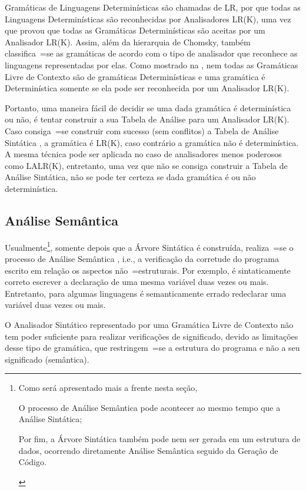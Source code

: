 Gramáticas de Linguagens Determinísticas são chamadas de LR,
por que todas as Linguagens Determinísticas são reconhecidas por Analisadores LR(K),
uma vez que  provou que todas as Gramáticas Determinísticas são aceitas por um Analisador LR(K).
Assim,
além da hierarquia de Chomsky,
também classifica~=se as gramáticas de acordo com o tipo de analisador que reconhece as linguagens representadas por elas.
Como mostrado na ,
nem todas as Gramáticas Livre de Contexto são de gramáticas Determinísticas e
uma gramática é Determinística somente se ela pode ser reconhecida por um Analisador LR(K).

Portanto,
uma maneira fácil de decidir se uma dada gramática é determinística ou
não,
é tentar construir a sua Tabela de Análise para um Analisador LR(K).
Caso consiga~=se construir com sucesso (sem conflitos) a Tabela de Análise Sintática \cite{ahoCompilerDragonBook},
a gramática é LR(K),
caso contrário a gramática não é determinística.
A mesma técnica pode ser aplicada no caso de analisadores menos poderosos como LALR(K),
entretanto,
uma vez que não se consiga construir a Tabela de Análise Sintática,
não se pode ter certeza se dada gramática é ou
não determinística.


\subsection{Análise Semântica}
\label{analiseSemantica}

Usualmente\footnote{
Como será apresentado mais a frente nesta seção,
\begin{inparaenum}[1)]
\item O processo de Análise Semântica pode acontecer ao mesmo tempo que a Análise Sintática;
\item Por fim,
a Árvore Sintática também pode nem ser gerada em um estrutura de dados,
ocorrendo diretamente Análise Semântica seguido da Geração de Código.
\end{inparaenum}
},
somente depois que a Árvore Sintática é construída,
realiza~=se o processo de Análise Semântica \cite{ahoCompilerDragonBook},
i.e.,
a verificação da corretude do programa escrito em relação os aspectos não~=estruturais.
Por exemplo,
é sintaticamente correto escrever a declaração de uma mesma variável duas vezes ou
mais. Entretanto,
para algumas linguagens é semanticamente errado redeclarar uma variável duas vezes ou
mais.

O Analisador Sintático representado por uma Gramática Livre de Contexto não tem poder suficiente para realizar verificações de significado,
devido as limitações desse tipo de gramática,
que restringem~=se a estrutura do programa e
não a seu significado (semântica).

